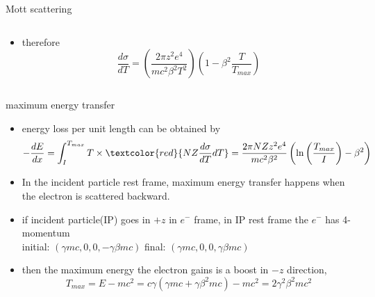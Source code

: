 \documentclass{beamer}
\begin{document}
\begin{frame}{Mott scattering}
\begin{columns}
\begin{column}{0.8\textwidth}
\begin{itemize}
	\item	therefore
		\begin{equation}
		\frac{d\sigma}{dT}=\left( \frac{2\pi z^2e^4}{mc^2\beta^2T^2} \right)\left( 1-\beta^2\frac{T}{T_{max}} \right)
		\end{equation}
	\end{itemize}
	\end{column}
\end{columns}

\end{frame}



\begin{frame}{maximum energy transfer}
\begin{itemize}
\item energy loss per unit length can be obtained by
\begin{equation}
-\frac{dE}{dx}=\int_I^{T_{max}}T\times \textcolor{red}{NZ\frac{d\sigma}{dT}dT}=\frac{2\pi NZz^2e^4}{mc^2\beta^2}\left(\ln\left( \frac{T_{max}}{I} \right)-\beta^2 \right)
\end{equation}
\item In the incident particle rest frame, maximum energy transfer happens when the electron is scattered backward.\\
\item if incident particle(IP) goes in $+z$ in $e^-$ frame, in IP rest frame the $e^-$ has 4-momentum\\
initial: $(\gamma mc,0,0,-\gamma\beta mc)$ final: $(\gamma mc,0,0,\gamma\beta mc)$
\item then the maximum energy the electron gains is a boost in $-z$ direction,
\begin{equation}
T_{max}=E-mc^2=c\gamma(\gamma mc+\gamma\beta^2mc)-mc^2 = 2\gamma^2\beta^2mc^2
\end{equation}
\end{itemize}
\end{frame}
\end{document}
